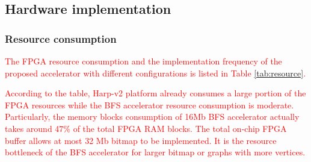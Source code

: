 %



\subsection{Hardware implementation}
\subsubsection{Resource consumption}
\textcolor{red}{The FPGA resource consumption and the implementation frequency of 
the proposed accelerator with different configurations 
is listed in Table \ref{tab:resource}.} 

\textcolor{red}{According to the table, Harp-v2 platform already consumes 
a large portion of the FPGA resources while the BFS accelerator resource 
consumption is moderate. Particularly, the memory blocks consumption of 
16Mb BFS accelerator actually takes around 47\% of the total FPGA 
RAM blocks. The total on-chip FPGA buffer allows at most 32 Mb bitmap 
to be implemented. It is the resource bottleneck of the BFS 
accelerator for larger bitmap or graphs with more vertices.}

